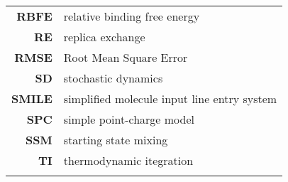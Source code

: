\begin{center}
\begin{longtable}{ >{\bfseries}r l}
 RBFE & relative binding free energy \\
 RE & replica exchange\\
 RMSE & Root Mean Square Error\\

 SD  & stochastic dynamics\\
 SMILE & simplified molecule input line entry system\\
 SPC & simple point-charge model\\
 SSM & starting state mixing \\

 TI  & thermodynamic itegration \\
\label{tab:abbreviations}
\end{longtable}
\end{center}
